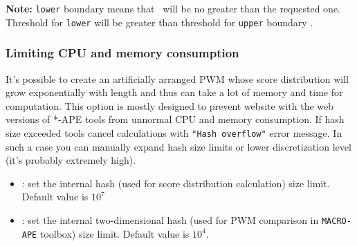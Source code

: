\textbf{Note:} \texttt{lower} boundary means that \pvalue\ will be no greater than the requested one. Threshold for \texttt{lower} will be greater than threshold for \texttt{upper} boundary \pvalue.


\subsubsection{Limiting CPU and memory consumption}
It's possible to create an artificially arranged PWM whose score distribution will grow exponentially with length and thus can take a lot of memory and time for computation. This option is mostly designed to prevent website with the web versions of *-APE tools from unnormal CPU and memory consumption. If hash size exceeded tools cancel calculations with \texttt{"Hash overflow"} error message. In such a case you can manually expand hash size limits or lower discretization level (it's probably extremely high).
  \begin{itemize}
  \item {}: set the internal hash (used for score distribution calculation) size limit. Default value is $10^7$
  \item {}: set the internal two-dimensional hash (used for PWM comparison in \texttt{MACRO-APE} toolbox) size limit. Default value is $10^4$.
  \end{itemize}
